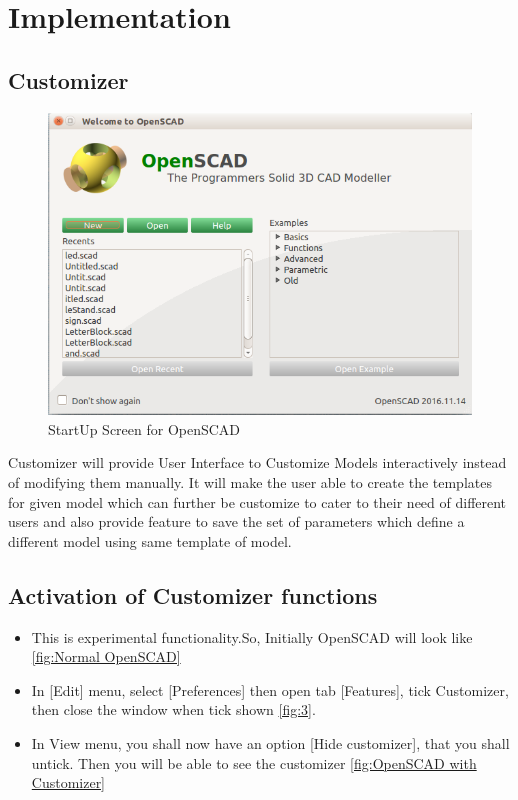 \section{Implementation}
\subsection{Customizer}

\begin{figure}[H] 
	\centering \includegraphics[scale=0.40]{images/output/1.png}
	\caption{StartUp Screen for OpenSCAD}
	\label{fig:1}
\end{figure}

Customizer  will provide User Interface to Customize Models interactively instead of modifying them manually. It will make the user able to create the templates for given model which can further be customize to cater to their need of different users and also provide feature to save the set of parameters which define a different model using same template of model.
\subsection{Activation of Customizer functions}
\begin{itemize}
	
	\item This is experimental functionality.So, Initially 
	OpenSCAD will look like \ref{fig:Normal OpenSCAD}
	\item In [Edit] menu, select [Preferences] then open tab [Features], tick Customizer, then close the window when tick shown \ref{fig:3}.
    \item In View menu, you shall now have an option [Hide customizer], that you shall untick. Then you will be able to see the customizer \ref{fig:OpenSCAD with Customizer}
    
\end{itemize}

